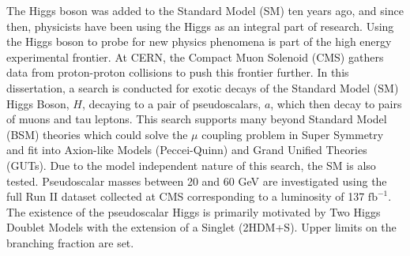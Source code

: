 The Higgs boson was added to the Standard Model (SM) ten years ago, and since then, physicists have been using the Higgs as an integral part of research.  
Using the Higgs boson to probe for new physics phenomena is part of the high energy experimental frontier. 
At CERN, the Compact Muon Solenoid (CMS) gathers data from proton-proton collisions to push this frontier further. 
In this dissertation, a search is conducted for exotic decays of the Standard Model (SM) Higgs Boson, $H$, decaying to a pair of pseudoscalars, $a$, which then decay to pairs of muons and tau leptons. 
This search supports many beyond Standard Model (BSM) theories which could solve the $\mu$ coupling problem in Super Symmetry and fit into Axion-like Models (Peccei-Quinn) and Grand Unified Theories (GUTs). 
Due to the model independent nature of this search, the SM is also tested. 
Pseudoscalar masses between 20 and 60 GeV are investigated using the full Run II dataset collected at CMS corresponding to a luminosity of 137 $\text{fb}^{-1}$. The existence of the pseudoscalar Higgs is primarily motivated by Two Higgs Doublet Models with the extension of a Singlet (2HDM+S). Upper limits on the branching fraction are set.
